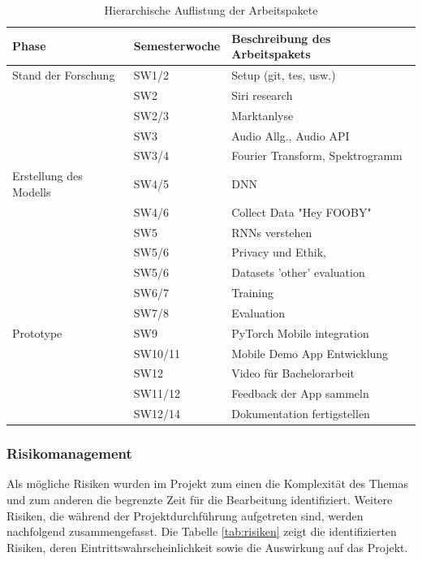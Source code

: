\documentclass[main.tex]{subfiles} %
\begin{document}
\begin{table}[ht]
    \centering
    \begin{tabularx}{\textwidth}{llX}
    \toprule
    \textbf{Phase} & \textbf{Semesterwoche} & \textbf{Beschreibung des Arbeitspakets} \\
    \midrule
    Stand der Forschung     & SW1/2  & Setup (git, tes, usw.) \\
                            & SW2    & Siri research  \\
                            & SW2/3  & Marktanlyse \\
                            & SW3    & Audio Allg., Audio API \\
                            & SW3/4  & Fourier Transform, Spektrogramm \\
    \addlinespace
    Erstellung des Modells  & SW4/5  & DNN \\
                            & SW4/6  & Collect Data "Hey FOOBY" \\
                            & SW5    & RNNs verstehen \\
                            & SW5/6  & Privacy und Ethik,  \\
                            & SW5/6  & Datasets 'other' evaluation \\
                            & SW6/7  & Training \\
                            & SW7/8  & Evaluation \\
    \addlinespace
    Prototype               & SW9       & PyTorch Mobile integration \\ 
                            & SW10/11   & Mobile Demo App Entwicklung \\
                            & SW12      & Video für Bachelorarbeit \\
                            & SW11/12   & Feedback der App sammeln \\
                            & SW12/14   & Dokumentation fertigstellen \\

    \bottomrule
    \end{tabularx}
    \caption{Hierarchische Auflistung der Arbeitspakete}
    \label{fig:backlog_table}
\end{table}



\subsubsection{Risikomanagement}
Als mögliche Risiken wurden im Projekt zum einen die Komplexität des Themas und zum anderen die
begrenzte Zeit für die Bearbeitung identifiziert. Weitere Risiken, die während der 
Projektdurchführung aufgetreten sind, werden nachfolgend zusammengefasst. Die Tabelle 
\ref{tab:risiken} zeigt die identifizierten Risiken, deren Eintrittswahrscheinlichkeit sowie die 
Auswirkung auf das Projekt.
\end{document}
